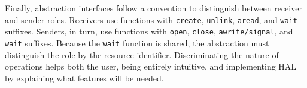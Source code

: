 
			Finally, abstraction interfaces follow a convention to distinguish
			between receiver and sender roles. Receivers use functions with
			\texttt{create}, \texttt{unlink}, \texttt{aread}, and \texttt{wait}
			suffixes. Senders, in turn, use functions with \texttt{open},
			\texttt{close}, \texttt{awrite/signal}, and \texttt{wait} suffixes.
			Because the \texttt{wait} function is shared, the abstraction must
			distinguish the role by the resource identifier. Discriminating the
			nature of operations helps both the user, being entirely intuitive,
			and implementing HAL by explaining what features will be needed.




